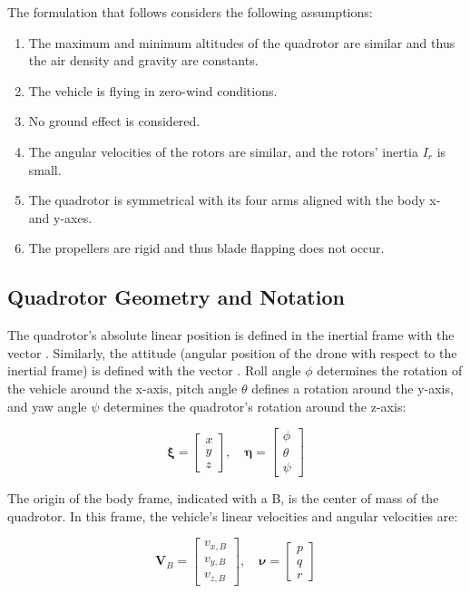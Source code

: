 \documentclass[letterpaper, 10 pt, conference]{ieeeconf}  %
\begin{document}
The formulation that follows considers the following assumptions:
\begin{enumerate}
	\item The maximum and minimum altitudes of the quadrotor are similar and thus the air density and gravity are constants.
	\item The vehicle is flying in zero-wind conditions.
	\item No ground effect is considered.
	\item \label{as:Ir} The angular velocities of the rotors are similar, and the rotors' inertia $I_r$ is small.
	\item \label{as:inertia} The quadrotor is symmetrical with its four arms aligned with the body x- and y-axes.
	\item The propellers are rigid and thus blade flapping does not occur.
\end{enumerate}

\subsection{Quadrotor Geometry and Notation}

The quadrotor's absolute linear position is defined in the inertial frame with the vector \bm{$\xi$}. Similarly, the attitude (angular position of the drone with respect to the inertial frame) is defined with the vector \bm{$\eta$}. Roll angle $\phi$ determines the rotation of the vehicle around the x-axis, pitch angle $\theta$ defines a rotation around the y-axis, and yaw angle $\psi$ determines the quadrotor's rotation around the z-axis:


$$\bm{\xi}=\left[ \begin{array}{l}{x} \\ {y} \\ {z}\end{array}\right],
\quad \bm{\eta}=\left[ \begin{array}{l}{\phi} \\ {\theta} \\ {\psi}\end{array}\right]$$

The origin of the body frame, indicated with a B, is the center of mass of the quadrotor. In this frame, the vehicle's linear velocities  and angular velocities \bm{$\nu$} are:

$$\bm{V}_{B}=\left[ \begin{array}{c}{v_{x, B}} \\ {v_{y, B}} \\ {v_{z, B}}\end{array}\right], \quad \bm{\nu}=\left[ \begin{array}{l}{p} \\ {q} \\ {r}\end{array}\right]$$
\end{document}

